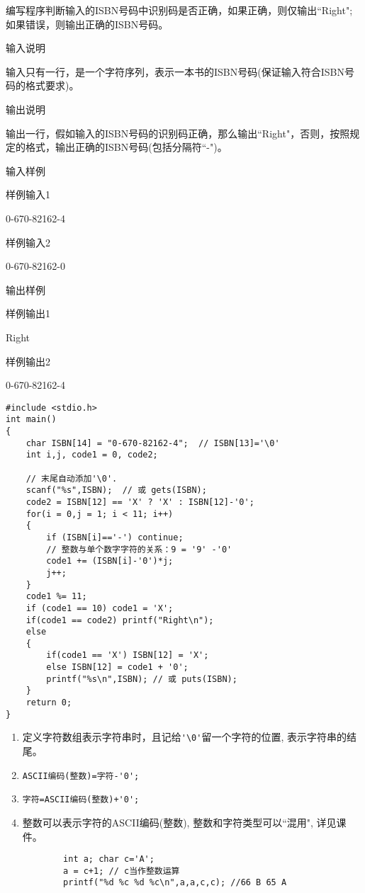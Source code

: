 编写程序判断输入的ISBN号码中识别码是否正确，如果正确，则仅输出``Right"; 如果错误，则输出正确的ISBN号码。

输入说明	

输入只有一行，是一个字符序列，表示一本书的ISBN号码(保证输入符合ISBN号码的格式要求)。

输出说明	

输出一行，假如输入的ISBN号码的识别码正确，那么输出``Right"，否则，按照规定的格式，输出正确的ISBN号码(包括分隔符``-")。

输入样例	

样例输入1

0-670-82162-4

样例输入2

0-670-82162-0

输出样例	

样例输出1

Right

样例输出2

0-670-82162-4

\begin{lstlisting}
#include <stdio.h>
int main()
{
	char ISBN[14] = "0-670-82162-4";  // ISBN[13]='\0'
	int i,j, code1 = 0, code2;
	
	// 末尾自动添加'\0'.
	scanf("%s",ISBN);  // 或 gets(ISBN); 
	code2 = ISBN[12] == 'X' ? 'X' : ISBN[12]-'0';
	for(i = 0,j = 1; i < 11; i++)
	{
		if (ISBN[i]=='-') continue;
		// 整数与单个数字字符的关系：9 = '9' -'0' 
		code1 += (ISBN[i]-'0')*j;  
		j++;
	}   
	code1 %= 11;
	if (code1 == 10) code1 = 'X';  
	if(code1 == code2) printf("Right\n");
	else 
	{
		if(code1 == 'X') ISBN[12] = 'X';
		else ISBN[12] = code1 + '0';
		printf("%s\n",ISBN); // 或 puts(ISBN);
	}
	return 0;
} 
\end{lstlisting}

\begin{note}[要点]
	\begin{enumerate}
		\item 定义字符数组表示字符串时，且记给\lstinline|'\0'|留一个字符的位置, 表示字符串的结尾。
		\item \lstinline|ASCII编码(整数)=字符-'0';|
		\item \lstinline|字符=ASCII编码(整数)+'0';|
		\item 整数可以表示字符的ASCII编码(整数), 整数和字符类型可以``混用", 详见课件。
		\begin{lstlisting}
		int a; char c='A';
		a = c+1; // c当作整数运算
		printf("%d %c %d %c\n",a,a,c,c); //66 B 65 A 
		\end{lstlisting}
	\end{enumerate}
\end{note}

